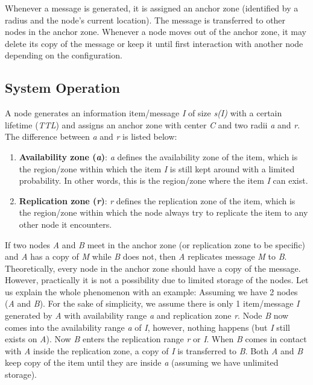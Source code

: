 Whenever a message is generated, it is assigned an anchor zone (identified by a radius and the node's current location). The message is transferred to other nodes in the anchor zone. Whenever a node moves out of the anchor zone, it may delete its copy of the message or keep it until first interaction with another node depending on the configuration.
\subsection {System Operation \cite{Ott2011FloatingCI}}
A node generates an information item/message \textit{I} of size \textit{s(I)} with a certain lifetime (\textit{TTL}) and assigns an anchor zone with center \textit{C} and two radii \textit{a} and \textit{r}. The difference between \textit{a} and \textit{r} is listed below:

\begin{enumerate}
  \item \textbf{Availability zone (\textit{a})}: \textit{a} defines the availability zone of the item, which is the region/zone within which the item \textit{I} is still kept around with a limited probability. In other words, this is the region/zone where the item \textit{I} can exist.
  \item \textbf{Replication zone (\textit{r})}: \textit{r} defines the replication zone of the item, which is the region/zone within which the node always try to replicate the item to any other node it encounters.
\end{enumerate}
\vspace{3mm}
If two nodes \textit{A} and \textit{B} meet in the anchor zone (or replication zone to be specific) and \textit{A} has a copy of \textit{M} while \textit{B} does not, then \textit{A} replicates message \textit{M} to \textit{B}. Theoretically, every node in the anchor zone should have a copy of the message. However, practically it is not a possibility due to limited storage of the nodes.
\vspace{3mm}
Let us explain the whole phenomenon with an example:
Assuming we have 2 nodes (\textit{A} and \textit{B}). For the sake of simplicity, we assume there is only 1 item/message \textit{I} generated by \textit{A} with availability range \textit{a} and replication zone \textit{r}. Node \textit{B} now comes into the availability range \textit{a} of \textit{I}, however, nothing happens (but \textit{I} still exists on \textit{A}). Now \textit{B} enters the replication range \textit{r} or \textit{I}. When \textit{B} comes in contact with \textit{A} inside the replication zone, a copy of \textit{I} is transferred to \textit{B}. Both \textit{A} and \textit{B} keep copy of the item until they are inside \textit{a} (assuming we have unlimited storage).

